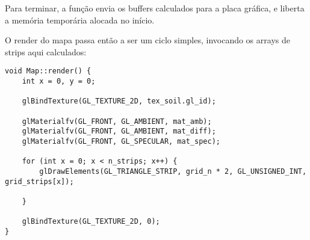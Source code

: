 Para terminar, a função envia os buffers calculados para a placa gráfica, e liberta a memória temporária alocada no início.

O render do mapa passa então a ser um ciclo simples, invocando os arrays de strips aqui calculados:

\begin{lstlisting}[caption=Render do mapa com VBOs]
void Map::render() {
	int x = 0, y = 0;

	glBindTexture(GL_TEXTURE_2D, tex_soil.gl_id);

	glMaterialfv(GL_FRONT, GL_AMBIENT, mat_amb);
	glMaterialfv(GL_FRONT, GL_AMBIENT, mat_diff);
	glMaterialfv(GL_FRONT, GL_SPECULAR, mat_spec);

	for (int x = 0; x < n_strips; x++) {
		glDrawElements(GL_TRIANGLE_STRIP, grid_n * 2, GL_UNSIGNED_INT, grid_strips[x]);

	}

	glBindTexture(GL_TEXTURE_2D, 0);
}
\end{lstlisting}
